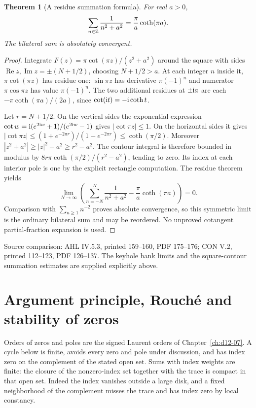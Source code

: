 \documentclass[11pt,a4paper,openany]{book}
\newtheorem{theorem}{Theorem}[chapter]
\theoremstyle{definition}
\theoremstyle{remark}\newtheorem{remark}[theorem]{Remark}
\DeclareMathOperator{\Ree}{Re}\DeclareMathOperator{\Imm}{Im}
\newcommand{\source}[1]{\par\begingroup\small\sffamily\color{black!65}Source comparison: #1\par\endgroup}
\begin{document}
\begin{theorem}[A residue summation formula]\label{d12:08-07-summation}
For real \(a>0\),
\[
 \sum_{n\in\mathbb Z}\frac1{n^2+a^2}=\frac{\pi}{a}\coth(\pi a).
\]
The bilateral sum is absolutely convergent.
\end{theorem}
\begin{proof}
Integrate
\(F(z)=\pi\cot(\pi z)/(z^2+a^2)\)
around the square with sides
\(\Ree z,\Imm z=\pm(N+1/2)\), choosing \(N+1/2>a\).
At each integer \(n\) inside it, \(\pi\cot(\pi z)\) has residue one:
\(\sin\pi z\) has derivative \(\pi(-1)^n\) and numerator
\(\pi\cos\pi z\) has value \(\pi(-1)^n\).
The two additional residues at \(\pm\mathrm i a\) are each
\(-\pi\coth(\pi a)/(2a)\), since
\(\cot(\mathrm i t)=-\mathrm i\coth t\).

Let \(r=N+1/2\). On the vertical sides the exponential expression
\(\cot w=\mathrm i(e^{2\mathrm i w}+1)/(e^{2\mathrm i w}-1)\) gives
\(|\cot\pi z|\le1\). On the horizontal sides it gives
\(|\cot\pi z|\le(1+e^{-2\pi r})/(1-e^{-2\pi r})
 \le\coth(\pi/2)\).
Moreover \(|z^2+a^2|\ge |z|^2-a^2\ge r^2-a^2\).
The contour integral is therefore bounded in modulus by
\(8r\pi\coth(\pi/2)/(r^2-a^2)\), tending to zero.
Its index at each interior pole is one by the explicit rectangle
computation. The residue theorem yields
\[
 \lim_{N\to\infty}
 \left(\sum_{n=-N}^N\frac1{n^2+a^2}
            -\frac{\pi}{a}\coth(\pi a)\right)=0.
\]
Comparison with \(\sum_{n\ge1}n^{-2}\) proves absolute convergence,
so this symmetric limit is the ordinary bilateral sum and may be
reordered. No unproved cotangent partial-fraction expansion is used.
\end{proof}
\source{AHL IV.5.3, printed 159--160, PDF 175--176; CON V.2, printed 112--123, PDF 126--137. The keyhole bank limits and the square-contour summation estimates are supplied explicitly above.}




\chapter{Argument principle, Rouch\'e and stability of zeros}\label{ch:d12-09}

Orders of zeros and poles are the signed Laurent orders of Chapter~\ref{ch:d12-07}. A cycle below is finite, avoids every zero and pole under discussion, and has index zero on the complement of the stated open set. Sums with index weights are finite: the closure of the nonzero-index set together with the trace is compact in that open set. Indeed the index vanishes outside a large disk, and a fixed neighborhood of the complement misses the trace and has index zero by local constancy.
\end{document}
